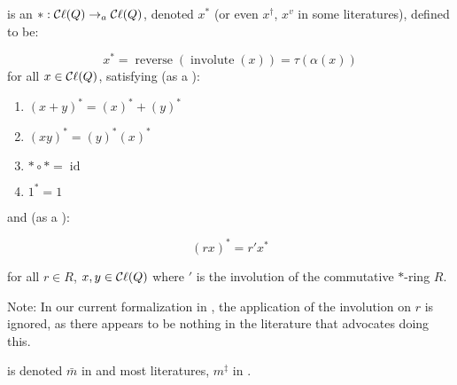 \begin{definition}
    \label{conjugate}
    \leanok

     is an   ${*} : \mathop{\mathcal{C}\ell}(Q) \to_{a} \mathop{\mathcal{C}\ell}(Q)$,
    denoted $x^{*}$ (or even $x^\dagger$, $x^v$ in some literatures),
    defined to be:

    $$ x^{*} = \operatorname{reverse}(\operatorname{involute}(x)) = \tau(\alpha(x)) $$ for all $x \in \mathop{\mathcal{C}\ell}(Q)$, satisfying
    (as a \href{https://en.wikipedia.org/wiki/*-algebra#*-ring}{}):

    \begin{enumerate}

    \item $(x + y)^{*} = (x)^{*} + (y)^{*}$
    \item $(x y)^{*} = (y)^{*} (x)^{*}$
    \item ${*} \circ {*} = \operatorname{id}$
    \item $1^{*} = 1$
    
    \end{enumerate}

    and (as a \href{https://en.wikipedia.org/wiki/*-algebra#*-algebra}{}):

    $$ (r x)^{*} = r' x^{*} $$
    
    for all $r \in R$, $x, y \in \mathop{\mathcal{C}\ell}(Q)$ where $'$ is the involution of the commutative $*$-ring $R$.

    Note: In our current formalization in \Mathlib, the application of the involution on $r$ is ignored,
    as there appears to be nothing in the literature that advocates doing this.



     is denoted $\bar{m}$ in \cite{lounesto2001clifford} and most literatures, $m^\ddagger$ in \cite{chisolm2012geometric}.

\end{definition}

